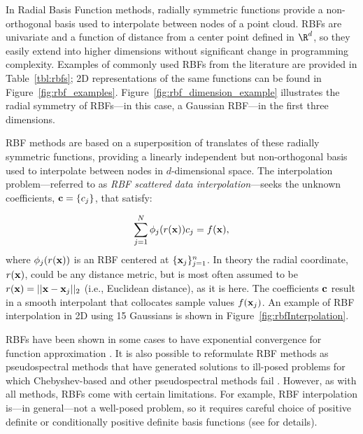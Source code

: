 \documentclass[11pt]{report}
\begin{document}
{In Radial Basis Function methods, radially symmetric functions provide a non-orthogonal basis used to interpolate between 
nodes of a point cloud. RBFs are univariate and a function of distance from a center point defined in $\R^d$, so 
they easily extend into higher dimensions without significant change in programming complexity. Examples of commonly used RBFs from the literature are provided in Table~\ref{tbl:rbfs}; 2D representations of the same functions can be found in Figure~\ref{fig:rbf_examples}. 
Figure~\ref{fig:rbf_dimension_example} illustrates the radial symmetry of RBFs---in this case, a Gaussian RBF---in the first three dimensions. 

RBF methods are based on a superposition of translates of these radially symmetric functions, providing a linearly independent but non-orthogonal basis used to interpolate between nodes in $d$-dimensional space. The interpolation problem---referred to as \emph{RBF scattered data interpolation}---seeks the unknown coefficients, $\mathbf{c} = \{c_j\}$, that satisfy: 
 
\begin{eqnarray*}
    \sum_{j=1}^{N} \phi_j(r(\mathbf{x})) c_{j}   = f(\mathbf{x}),
\end{eqnarray*}
where $\phi_j(r(\mathbf{x}))$ is an RBF centered at $\{\mathbf{x}_j\}_{j=1}^{n}$. In theory the radial coordinate, $r(\mathbf{x})$, could be any distance metric, but is most often assumed to be $r(\mathbf{x}) = ||\mathbf{x}-\mathbf{x}_j||_2$ (i.e., Euclidean distance), as it is here. The coefficients $\mathbf{c}$ result in a smooth interpolant that collocates sample values $f(\mathbf{x}_j)$. An example of RBF interpolation in 2D using 15 Gaussians is shown in Figure~\ref{fig:rbfInterpolation}. 



RBFs have been shown in 
some cases to have exponential convergence for function approximation \cite{Fasshauer2007}. It is also possible to 
reformulate RBF methods as pseudospectral methods that have 
generated solutions to ill-posed problems for which Chebyshev-based and other pseudospectral methods 
fail \cite{Fasshauer2006}. However, as with all methods, RBFs come with certain limitations. For example, RBF interpolation is---in general---not a well-posed problem, so it requires careful choice of positive definite or conditionally positive definite basis functions (see \cite{Iske2004, Fasshauer2007} for details). 

}
\end{document}
